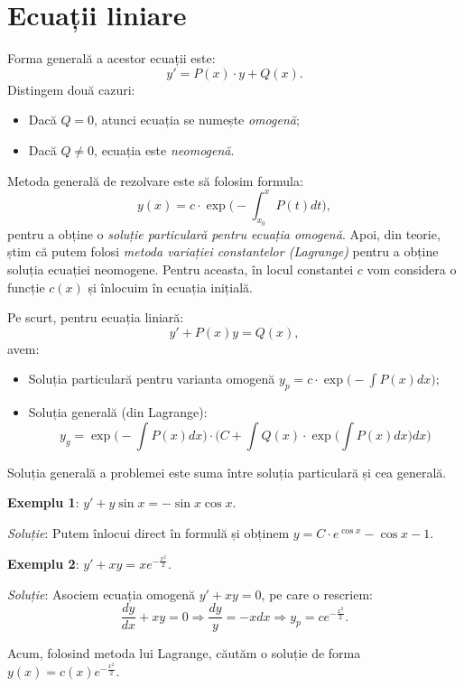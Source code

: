 
\section{Ecuații liniare}
\label{sec:lin}

Forma generală a acestor ecuații este:
\[
  y' = P(x) \cdot y + Q(x).
\]
Distingem două cazuri:
\begin{itemize}
\item Dacă $Q = 0$, atunci ecuația se numește \emph{omogenă};
\item Dacă $Q \neq 0$, ecuația este \emph{neomogenă}.
\end{itemize}

Metoda generală de rezolvare este să folosim formula:
\[
  y(x) = c \cdot \exp \Big( -\int_{x_0}^x P(t) dt \Big),
\]
pentru a obține o \emph{soluție particulară pentru ecuația omogenă}. Apoi, din teorie,
știm că putem folosi \emph{metoda variației constantelor (Lagrange)} pentru a obține
soluția ecuației neomogene. Pentru aceasta, în locul constantei $c$ vom considera
o funcție $c(x)$ și înlocuim în ecuația inițială.

Pe scurt, pentru ecuația liniară:
\[
  y' + P(x) y = Q(x),
\]
avem:
\begin{itemize}
  \item Soluția particulară pentru varianta omogenă $y_p = c \cdot \exp\Big( -\int P(x) dx \Big)$;
  \item Soluția generală (din Lagrange):
    \[
      y_g = \exp\Big(-\int P(x) dx\Big) \cdot \Big( C + \int Q(x) \cdot \exp\Big( \int P(x) dx \Big) dx \Big)
    \]
\end{itemize}

Soluția generală a problemei este suma între soluția particulară și cea generală.


\textbf{Exemplu 1}: $y' + y \sin x = -\sin x \cos x$.

\emph{Soluție}: Putem înlocui direct în formulă și obținem $y = C \cdot e^{\cos x} - \cos x - 1$.

\vspace{1cm}

\textbf{Exemplu 2}: $y' + xy = x e^{-\frac{x^2}{2}}$.

\emph{Soluție}: Asociem ecuația omogenă $y' + xy = 0$, pe care o rescriem:
\[
  \frac{dy}{dx} + xy = 0 \Rightarrow \frac{dy}{y} = -xdx \Rightarrow y_p = ce^{-\frac{x^2}{2}}.
\]

Acum, folosind metoda lui Lagrange, căutăm o soluție de forma $y(x) = c(x) e^{-\frac{x^2}{2}}$.

